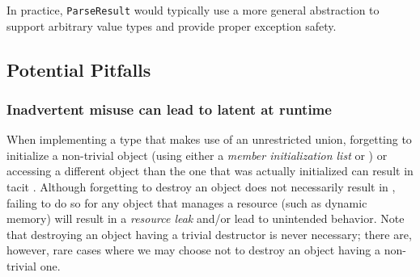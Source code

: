In practice, \lstinline!ParseResult! would typically use a more general  abstraction to support arbitrary value types and provide proper exception safety.
    

\subsection[Potential Pitfalls]{Potential Pitfalls}\label{potential-pitfalls}

\subsubsection[Inadvertent misuse can lead to latent \romeogloss{undefined behavior} at runtime]{Inadvertent misuse can lead to latent  at runtime}\label{inadvertent-misuse-can-lead-to-latent-undefined-behavior-at-runtime}

When implementing a type that makes use of an unrestricted union,
forgetting to initialize a non-trivial object (using either a
\emph{member initialization list} or ) or
accessing a different object than the one that was actually initialized
can result in tacit . Although forgetting to
destroy an object does not necessarily result in , failing to do so for any object that manages a resource (such
as dynamic memory) will result in a \emph{resource leak} and/or lead to
unintended behavior. Note that destroying an
object having a trivial destructor is never necessary; there are, however, rare cases where
we may choose not to destroy an object having a non-trivial
one.

